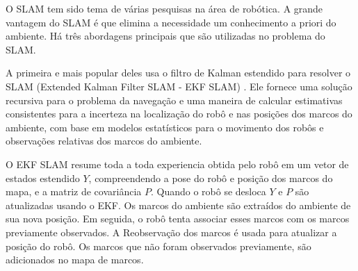  O SLAM tem sido tema de várias pesquisas na área de robótica. A grande vantagem do SLAM é que elimina a necessidade 
um conhecimento a priori do ambiente. Há três abordagens principais que são utilizadas no problema do SLAM. 

A primeira e mais popular deles usa o filtro de Kalman estendido para resolver o SLAM (Extended Kalman Filter SLAM - EKF SLAM) \cite{slam2}. Ele
fornece uma solução recursiva para o problema da navegação e uma maneira de calcular
estimativas consistentes para a incerteza na localização do robô e nas posições dos marcos do
ambiente, com base em modelos estatísticos para o movimento dos robôs e observações
relativas dos marcos do ambiente\cite{slam}.

O EKF SLAM resume toda a toda experiencia obtida pelo robô em um vetor de estados estendido $Y$, compreendendo a pose do 
robô e posição dos marcos do mapa, e a matriz de covariância $P$\cite{slam2}. Quando o robô se desloca $Y$ e $P$ são atualizadas
usando o EKF. Os marcos do ambiente são extraídos do ambiente de sua nova posição. Em seguida, o robô tenta associar esses
marcos com os marcos previamente observados. A Reobservação dos marcos é usada para atualizar a posição do robô. 
Os marcos que não foram observados previamente, são adicionados no mapa de marcos.

